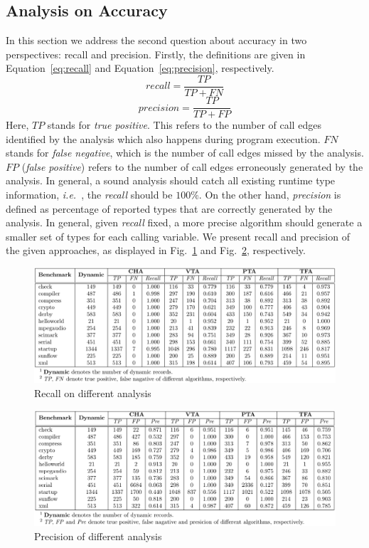 \documentclass{fac}
\newcommand\ie{\textit{i.e.\ }}
\begin{document}
\subsection{Analysis on Accuracy}\label{subsec:accuracy}

In this section we address the second question about accuracy in two perspectives: recall and precision. Firstly, the definitions are given in Equation~\ref{eq:recall} and Equation~\ref{eq:precision}, respectively.
\begin{equation}\label{eq:recall}
recall = \dfrac{TP}{TP+FN}
\end{equation}
\begin{equation}\label{eq:precision}
precision =  \dfrac{TP}{TP+FP}
\end{equation}
Here, $TP$ stands for \emph{true positive}. This refers to the number of call edges identified by the analysis which also happens during program execution. $FN$ stands for \emph{false negative}, which is the number of call edges missed by the analysis. $FP$ (\emph{false positive}) refers to the number of call edges erroneously generated by the analysis. In general, a sound analysis should catch all existing runtime type information, \ie, the \emph{recall} should be $100\%$. On the other hand, \emph{precision} is defined as percentage of reported types that are correctly generated by the analysis. In general, given \emph{recall} fixed, a more precise algorithm should generate a smaller set of types for each calling variable. %
We present recall and precision of the given approaches, as displayed in Fig.~\ref{fig:recall} and Fig.~\ref{fig:precision}, respectively.


\begin{figure}\centering
\includegraphics[scale=0.9]{recall-lib.pdf}
\caption{Recall on different analysis}
\label{fig:recall}
\end{figure}

\begin{figure}\centering
\includegraphics[scale=0.9]{precision-lib.pdf}
\caption{Precision of different analysis}
\label{fig:precision}
\end{figure}
\end{document}
